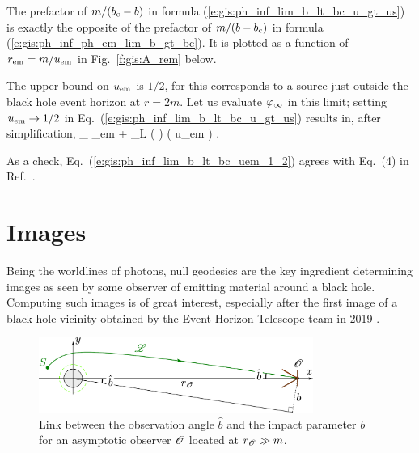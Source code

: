 \begin{remark} \label{r:gis:prefactor_b_bc}
The prefactor of $m/(b_{\rm c} - b)$ in
formula (\ref{e:gis:ph_inf_lim_b_lt_bc_u_gt_us}) is exactly the
opposite of the prefactor of $m/(b - b_{\rm c})$ in formula (\ref{e:gis:ph_inf_ph_em_lim_b_gt_bc}).
It is plotted as a function of $r_{\rm em} = m/u_{\rm em}$ in Fig.~\ref{f:gis:A_rem} below.
\end{remark}

The upper bound on $u_{\rm em}$ is $1/2$, for this corresponds to a source
just outside the black hole event horizon at $r=2m$. Let us evaluate
$\varphi_\infty$ in this limit; setting $u_{\rm em}\to 1/2$ in Eq.~(\ref{e:gis:ph_inf_lim_b_lt_bc_u_gt_us}) results in, after simplification,
\be  \label{e:gis:ph_inf_lim_b_lt_bc_uem_1_2}
   \ph_\infty  {} \ph_{\rm em}
    + \eps_L  \ln\left(  \right)
    \qquad \left( u_{\rm em} \to {} \right) .
\ee

\begin{remark}
As a check, Eq.~(\ref{e:gis:ph_inf_lim_b_lt_bc_uem_1_2}) agrees with
Eq.~(4) in Ref.~\cite{GrallHW19}.
\end{remark}



\section{Images} \label{s:gis:images}

Being the worldlines of photons, null geodesics are the key ingredient
determining images as seen by some observer of emitting material around
a black hole. Computing such images is of great interest, especially after
the first image of a black hole vicinity obtained by
the Event Horizon Telescope team in 2019 \cite{EHT19a,Cardo19}.

\begin{figure}
\centerline{\includegraphics[width=0.8\textwidth]{gis_obs_angle.pdf}}
\caption[]{\label{f:gis:obs_angle} \footnotesize
Link between the observation angle $\hat{b}$ and the impact parameter $b$
for an asymptotic observer $\mathscr{O}$ located at $r_{\mathscr{O}} \gg m$.}
\end{figure}


